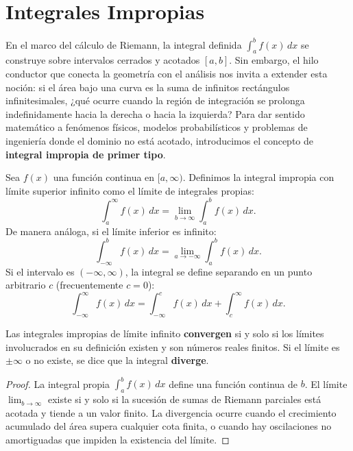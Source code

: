 


\chapter{Integrales Impropias}\label{cap:impropias}


En el marco del cálculo de Riemann, la integral definida $\int_{a}^{b} f(x)\,dx$ se construye
sobre intervalos cerrados y acotados $[a, b]$. Sin embargo, el hilo conductor que conecta
la geometría con el análisis nos invita a extender esta noción: si el área bajo una curva es la
suma de infinitos rectángulos infinitesimales, ¿qué ocurre cuando la región de integración se
prolonga indefinidamente hacia la derecha o hacia la izquierda? Para dar sentido matemático a
fenómenos físicos, modelos probabilísticos y problemas de ingeniería donde el dominio no está
acotado, introducimos el concepto de \textbf{integral impropia de primer tipo}.

\begin{definition}
Sea $f(x)$ una función continua en $[a, \infty)$. Definimos la integral impropia con límite
superior infinito como el límite de integrales propias:
\[
  \int_{a}^{\infty} f(x)\,dx = \lim_{b \to \infty} \int_{a}^{b} f(x)\,dx.
\]
De manera análoga, si el límite inferior es infinito:
\[
  \int_{-\infty}^{b} f(x)\,dx = \lim_{a \to -\infty} \int_{a}^{b} f(x)\,dx.
\]
Si el intervalo es $(-\infty,\infty)$, la integral se define separando en un punto arbitrario
$c$ (frecuentemente $c=0$):
\[
  \int_{-\infty}^{\infty} f(x)\,dx
  = \int_{-\infty}^{c} f(x)\,dx + \int_{c}^{\infty} f(x)\,dx.
\]
\end{definition}

\begin{theorem}
Las integrales impropias de límite infinito \textbf{convergen} si y solo si los límites
involucrados en su definición existen y son números reales finitos. Si el límite es $\pm\infty$
o no existe, se dice que la integral \textbf{diverge}.
\begin{proof}
La integral propia $\int_{a}^{b} f(x)\,dx$ define una función continua de $b$. El límite
$\lim_{b\to\infty}$ existe si y solo si la sucesión de sumas de Riemann parciales está acotada y
tiende a un valor finito. La divergencia ocurre cuando el crecimiento acumulado del área supera
cualquier cota finita, o cuando hay oscilaciones no amortiguadas que impiden la existencia del
límite.
\end{proof}
\end{theorem}

